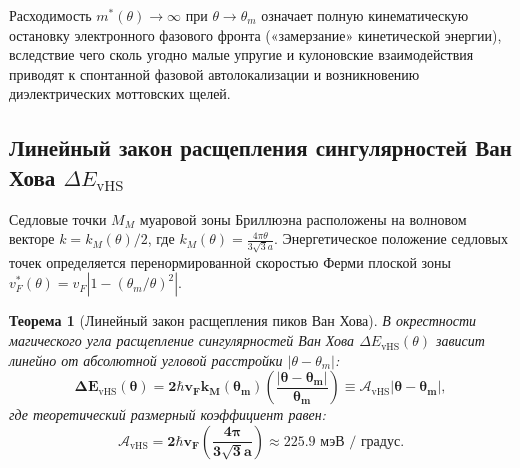 \documentclass[12pt,a4paper]{article}
\newtheorem{theorem}{Теорема}
\begin{document}
Расходимость $m^*(\theta) \to \infty$ при $\theta \to \theta_m$ означает полную кинематическую остановку электронного фазового фронта («замерзание» кинетической энергии), вследствие чего сколь угодно малые упругие и кулоновские взаимодействия приводят к спонтанной фазовой автолокализации и возникновению диэлектрических моттовских щелей.

\subsection{Линейный закон расщепления сингулярностей Ван Хова $\Delta E_{\text{vHS}}$}
Седловые точки $M_M$ муаровой зоны Бриллюэна расположены на волновом векторе $k = k_M(\theta)/2$, где $k_M(\theta) = \frac{4\pi \theta}{3\sqrt{3} a}$. Энергетическое положение седловых точек определяется перенормированной скоростью Ферми плоской зоны $v_F^*(\theta) = v_F \left| 1 - (\theta_m/\theta)^2 \right|$.

\begin{theorem}[Линейный закон расщепления пиков Ван Хова]
	В окрестности магического угла расщепление сингулярностей Ван Хова $\Delta E_{\mathrm{vHS}}(\theta)$ зависит линейно от абсолютной угловой расстройки $|\theta - \theta_m|$:
	\begin{equation}
		\mathbf{\Delta E_{\mathrm{vHS}}(\theta) = 2 \hbar v_F k_M(\theta_m) \left( \frac{|\theta - \theta_m|}{\theta_m} \right) \equiv \mathcal{A}_{\mathrm{vHS}} |\theta - \theta_m|},
	\end{equation}
	где теоретический размерный коэффициент равен:
	\begin{equation}
		\mathbf{\mathcal{A}_{\mathrm{vHS}} = 2 \hbar v_F \left( \frac{4\pi}{3\sqrt{3} a} \right) \approx \mathbf{225.9\text{ мэВ / градус}}}.
	\end{equation}
\end{theorem}
\end{document}
